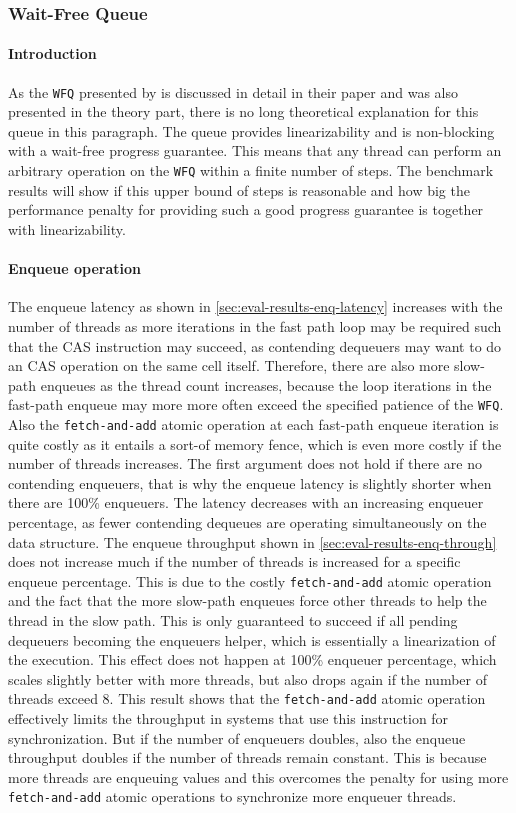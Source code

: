 \documentclass{article}
\newcommand{\WFQ}{\texttt{WFQ}}
\begin{document}
\subsubsection{Wait-Free Queue\label{sec:eval-benchmark-wfq}}
\paragraph{Introduction}
As the \WFQ{} presented by \citeauthor{WFQ} is discussed in detail in their paper \cite{WFQ} and was also presented in the theory part, there is no long theoretical explanation for this queue in this paragraph. The queue provides linearizability and is non-blocking with a wait-free progress guarantee. This means that any thread can perform an arbitrary operation on the \WFQ{} within a finite number of steps. The benchmark results will show if this upper bound of steps is reasonable and how big the performance penalty for providing such a good progress guarantee is together with linearizability.
\paragraph{Enqueue operation}
The enqueue latency as shown in \ref{sec:eval-results-enq-latency} increases with the number of threads as more iterations in the fast path loop may be required such that the CAS instruction may succeed, as contending dequeuers may want to do an CAS operation on the same cell itself. Therefore, there are also more slow-path enqueues as the thread count increases, because the loop iterations in the fast-path enqueue may more more often exceed the specified patience of the \WFQ. Also the \texttt{fetch-and-add} atomic operation at each fast-path enqueue iteration is quite costly as it entails a sort-of memory fence, which is even more costly if the number of threads increases. The first argument does not hold if there are no contending enqueuers, that is why the enqueue latency is slightly shorter when there are 100\% enqueuers. The latency decreases with an increasing enqueuer percentage, as fewer contending dequeues are operating simultaneously on the data structure. The enqueue throughput shown in \ref{sec:eval-results-enq-through} does not increase much if the number of threads is increased for a specific enqueue percentage. This is due to the costly \texttt{fetch-and-add} atomic operation and the fact that the more slow-path enqueues force other threads to help the thread in the slow path. This is only guaranteed to succeed if all pending dequeuers becoming the enqueuers helper, which is essentially a linearization of the execution. This effect does not happen at 100\% enqueuer percentage, which scales slightly better with more threads, but also drops again if the number of threads exceed $8$. This result shows that the \texttt{fetch-and-add} atomic operation effectively limits the throughput in systems that use this instruction for synchronization. But if the number of enqueuers doubles, also the enqueue throughput doubles if the number of threads remain constant. This is because more threads are enqueuing values and this overcomes the penalty for using more \texttt{fetch-and-add} atomic operations to synchronize more enqueuer threads.
\end{document}
